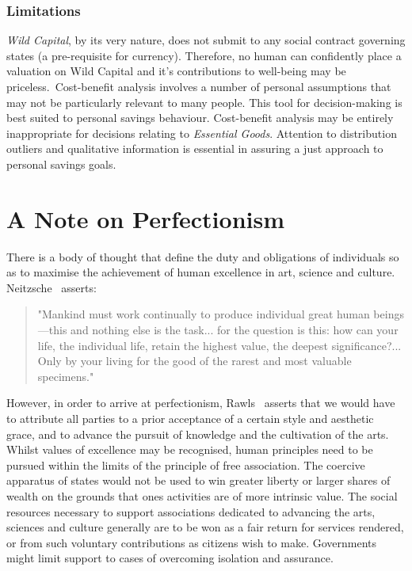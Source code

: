 \documentclass[11pt, oneside]{book}   	%
\begin{document}
\subsubsection{Limitations}

\emph{Wild Capital}, by its very nature, does not submit to any social contract governing states (a pre-requisite for currency).
Therefore, no human can confidently place a valuation on Wild Capital and it's contributions to well-being may be priceless.\
Cost-benefit analysis involves a number of personal assumptions that may not be particularly relevant to many people. This tool for decision-making is best suited to personal savings behaviour.
Cost-benefit analysis may be entirely inappropriate for decisions relating to \emph{Essential Goods}.
Attention to distribution outliers and qualitative information is essential in assuring a just approach to personal savings goals.

\section{A Note on Perfectionism}

There is a body of thought that define the duty and obligations of individuals so as to maximise the achievement of human excellence in art, science and culture. Neitzsche~\cite{gam1} asserts:

\begin{quote}
"Mankind must work continually to produce individual great human beings---this and nothing else is the task... for the question is this: how can your life, the individual life, retain the highest value, the deepest significance?... Only by your living for the good of the rarest and most valuable specimens."
\end{quote}
However, in order to arrive at perfectionism, Rawls~\cite{jr1} asserts that we would have to attribute all parties to a prior acceptance of a certain style and aesthetic grace, and to advance the pursuit of knowledge and the cultivation of the arts.
Whilst values of excellence may be recognised, human principles need to be pursued within the limits of the principle of free association.
The coercive apparatus of states would not be used to win greater liberty or larger shares of wealth on the grounds that ones activities are of more intrinsic value.
The social resources necessary to support associations dedicated to advancing the arts, sciences and culture generally are to be won as a fair return for services rendered, or from such voluntary contributions as citizens wish to make.
Governments might limit support to cases of overcoming isolation and assurance.
\end{document}
